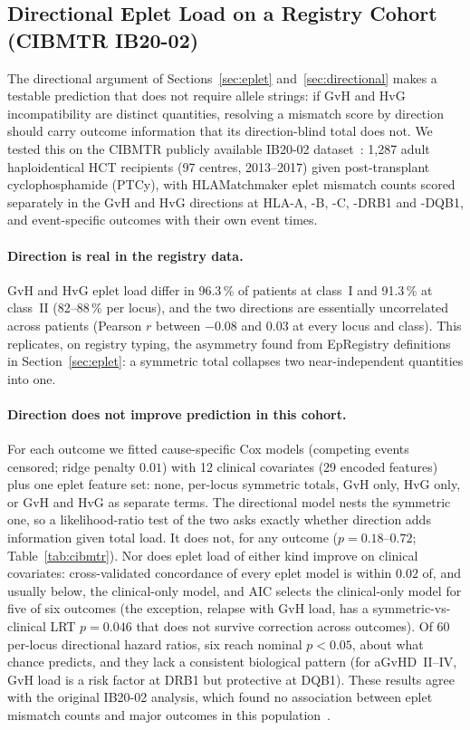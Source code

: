\documentclass[11pt,a4paper]{article}
\begin{document}
\subsection{Directional Eplet Load on a Registry Cohort (CIBMTR IB20-02)}
\label{sec:cibmtr}

The directional argument of Sections~\ref{sec:eplet}
and~\ref{sec:directional} makes a testable prediction that does not require
allele strings: if GvH and HvG incompatibility are distinct quantities,
resolving a mismatch score by direction should carry outcome information that
its direction-blind total does not.  We tested this on the CIBMTR publicly
available IB20-02 dataset~\citep{Zou2022Eplet}: 1{,}287 adult haploidentical
HCT recipients (97 centres, 2013--2017) given post-transplant
cyclophosphamide (PTCy), with HLAMatchmaker eplet mismatch counts scored
separately in the GvH and HvG directions at HLA-A, -B, -C, -DRB1 and -DQB1,
and event-specific outcomes with their own event times.

\paragraph{Direction is real in the registry data.}
GvH and HvG eplet load differ in 96.3\,\% of patients at class~I and
91.3\,\% at class~II (82--88\,\% per locus), and the two directions are
essentially uncorrelated across patients (Pearson $r$ between $-0.08$ and
$0.03$ at every locus and class).  This replicates, on registry typing, the
asymmetry found from EpRegistry definitions in Section~\ref{sec:eplet}: a
symmetric total collapses two near-independent quantities into one.

\paragraph{Direction does not improve prediction in this cohort.}
For each outcome we fitted cause-specific Cox models (competing events
censored; ridge penalty $0.01$) with 12 clinical covariates (29 encoded
features) plus one eplet feature set: none, per-locus symmetric totals,
GvH only, HvG only, or GvH and HvG as separate terms.  The directional model
nests the symmetric one, so a likelihood-ratio test of the two asks exactly
whether direction adds information given total load.  It does not, for any
outcome ($p = 0.18$--$0.72$; Table~\ref{tab:cibmtr}).  Nor does eplet load
of either kind improve on clinical covariates: cross-validated concordance of
every eplet model is within $0.02$ of, and usually below, the clinical-only
model, and AIC selects the clinical-only model for five of six outcomes (the
exception, relapse with GvH load, has a symmetric-vs-clinical LRT
$p = 0.046$ that does not survive correction across outcomes).  Of 60
per-locus directional hazard ratios, six reach nominal $p < 0.05$, about
what chance predicts, and they lack a consistent biological pattern (for
aGvHD~II--IV, GvH load is a risk factor at DRB1 but protective at DQB1).
These results agree with the original IB20-02 analysis, which found no
association between eplet mismatch counts and major outcomes in this
population~\citep{Zou2022Eplet}.
\end{document}
